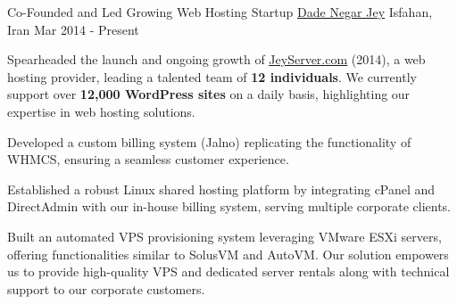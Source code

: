 
\begin{cventries}

  \cventry
    {Co-Founded and Led Growing Web Hosting Startup} %
    {\href{https://dnj.co.ir}{Dade Negar Jey}} %
    {Isfahan, Iran} %
    {Mar 2014 - Present} %
    {
      \begin{cvitems} %
        \item {Spearheaded the launch and ongoing growth of \href{https://www.jeyserver.com/}{\underline{JeyServer.com}} (2014), a web hosting provider, leading a talented team of \textbf{12 individuals}. We currently support over \textbf{12,000 WordPress sites} on a daily basis, highlighting our expertise in web hosting solutions.}
        \item {Developed a custom billing system (Jalno) replicating the functionality of WHMCS, ensuring a seamless customer experience.}
        \item {Established a robust Linux shared hosting platform by integrating cPanel and DirectAdmin with our in-house billing system, serving multiple corporate clients.}
        \item {Built an automated VPS provisioning system leveraging VMware ESXi servers, offering functionalities similar to SolusVM and AutoVM. Our solution empowers us to provide high-quality VPS and dedicated server rentals along with technical support to our corporate customers.}
      \end{cvitems}
    }


\end{cventries}
